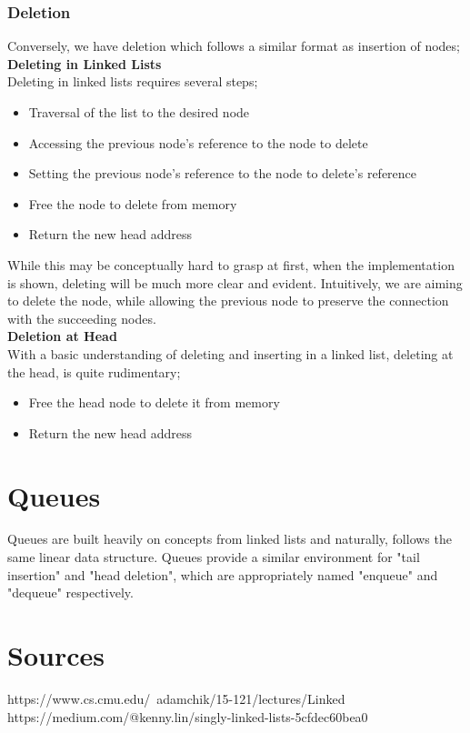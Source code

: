 \documentclass[hidelinks,11pt]{article}
\begin{document}
\subsubsection{Deletion}
Conversely, we have deletion which follows a similar format as insertion of nodes;\\[0.5\baselineskip]
\textbf{Deleting in Linked Lists}\\
Deleting in linked lists requires several steps;
\begin{itemize}
    \item Traversal of the list to the desired node
    \item Accessing the previous node's reference to the node to delete
    \item Setting the previous node's reference to the node to delete's reference 
    \item Free the node to delete from memory
    \item Return the new head address
\end{itemize}
While this may be conceptually hard to grasp at first, when the implementation is shown, deleting will be much more clear and evident. Intuitively, we are aiming to delete the node, while allowing the previous node to preserve the connection with the succeeding nodes.\\[0.5\baselineskip]
\textbf{Deletion at Head}\\
With a basic understanding of deleting and inserting in a linked list, deleting at the head, is quite rudimentary;
\begin{itemize}
    \item Free the head node to delete it from memory
    \item Return the new head address
\end{itemize}

\section{Queues}
Queues are built heavily on concepts from linked lists and naturally, follows the same linear data structure. Queues provide a similar environment for "tail insertion" and "head deletion", which are appropriately named "enqueue" and "dequeue" respectively.


\section{Sources}
https://www.cs.cmu.edu/~adamchik/15-121/lectures/Linked%
\\
https://medium.com/@kenny.lin/singly-linked-lists-5cfdec60bea0
\end{document}
